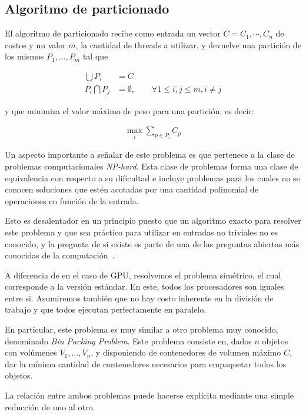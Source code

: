 \subsection{Algoritmo de particionado}

El algoritmo de particionado recibe como entrada un vector $C = {C_1, \cdots, C_n}$
de costos y un valor $m$, la cantidad de threads a utilizar, y devuelve una
partici\'on de los mismos $P_1, \dots, P_m$ tal que

\begin{align}
    \bigcup P_i & = C \\
    P_i \bigcap P_j & = \emptyset, \qquad \forall 1 \leq i,j \leq m, i \neq j
    \label{eq:partition-conditions}
\end{align}

y que minimiza el valor m\'aximo de peso para una partici\'on, es decir:

\begin{align}
    \displaystyle \max_i \sum_{p \in P_i} C_p
\end{align}

Un aspecto importante a se\~nalar de este problema es que pertenece a la clase
de problemas computacionales \textit{NP-hard}. Esta clase de problemas forma una
clase de equivalencia con respecto a su dificultad e incluye problemas para los
cuales no se conocen soluciones que est\'en acotadas por una cantidad polinomial
de operaciones en funci\'on de la entrada.

Esto es desalentador en un principio puesto que un algoritmo exacto para resolver
este problema y que sea pr\'actico para utilizar en entradas no triviales no es
conocido, y la pregunta de si existe es parte de una de las preguntas abiertas
m\'as conocidas de la computaci\'on~\cite{Cormen}.

A diferencia de en el caso de GPU, resolvemos el problema sim\'etrico, el cual
corresponde a la versi\'on est\'andar. En este, todos los procesadores son
iguales entre si. Asumiremos tambi\'en que no hay costo inherente en la
divisi\'on de trabajo y que todos ejecutan perfectamente en paralelo.

En particular, este problema es muy similar a otro problema muy conocido,
denominado \textit{Bin Packing Problem}. Este problema consiste en, dados $n$
objetos con vol\'umenes $V_1, \dots, V_n$, y disponiendo de contenedores de
volumen m\'aximo $C$, dar la m\'inima cantidad de contenedores necesarios para
empaquetar todos los objetos.

La relaci\'on entre ambos problemas puede hacerse expl\'icita mediante una simple
reducci\'on de uno al otro.

